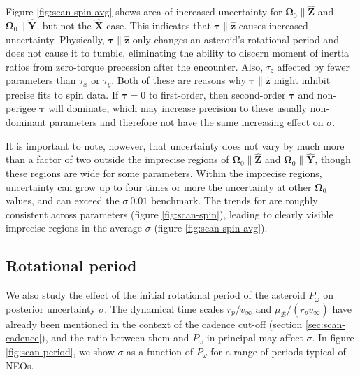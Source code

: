 \documentclass[fleqn,usenatbib]{mnras}
\newcommand{\unit}[1]{\bm{\hat{#1}}}
\begin{document}
Figure \ref{fig:scan-spin-avg} shows area of increased uncertainty for $\bm \Omega_0 \parallel \unit Z$ and $\bm \Omega_0 \parallel \unit Y$, but not the $\unit X$ case. This indicates that $\bm \tau \parallel \unit z$ causes increased uncertainty. Physically, $\bm \tau \parallel \unit z$ only changes an asteroid's rotational period and does not cause it to tumble, eliminating the ability to discern moment of inertia ratios from zero-torque precession after the encounter. Also, $\tau_z$ affected by fewer parameters than $\tau_x$ or $\tau_y$.  Both of these are reasons why $\bm \tau \parallel \unit z$ might inhibit precise fits to spin data. If $\bm \tau = 0$ to first-order, then second-order $\bm \tau$ and non-perigee $\bm \tau$ will dominate, which may increase precision to these usually non-dominant parameters and therefore not have the same increasing effect on $\sigma$.

It is important to note, however, that uncertainty does not vary by much more than a factor of two outside the imprecise regions of $\bm \Omega_0 \parallel \unit Z$ and $\bm \Omega_0 \parallel \unit Y$, though these regions are wide for some parameters. Within the imprecise regions, uncertainty can grow up to four times or more the uncertainty at other $\bm \Omega_0$ values, and can exceed the $\sigma ~0.01$ benchmark. The trends for are roughly consistent across parameters (figure \ref{fig:scan-spin}), leading to clearly visible imprecise regions in the average $\sigma$ (figure \ref{fig:scan-spin-avg}).




\subsection{Rotational period}
\label{sec:scan-period}

We also study the effect of the initial rotational period of the asteroid $P_\omega$ on posterior uncertainty $\sigma$. The dynamical time scales $r_p/v_\infty$ and $\mu_\mathcal{B} / (r_p v_\infty)$ have already been mentioned in the context of the cadence cut-off (section \ref{sec:scan-cadence}), and the ratio between them and $P_\omega$ in principal may affect $\sigma$. In figure \ref{fig:scan-period}, we show $\sigma$ as a function of $P_\omega$ for a range of periods typical of NEOs.
\end{document}
